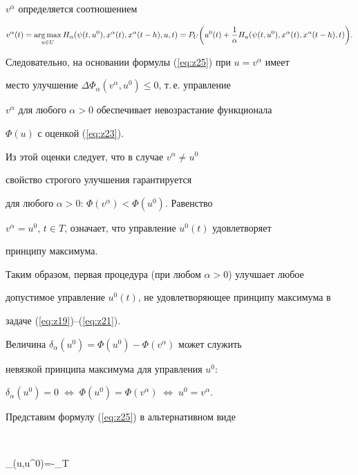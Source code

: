 $v^\alpha$ определяется соотношением


$$


v^\alpha(t)=\argmax_{u\in U}


H_\alpha(\psi(t,u^0),x^\alpha(t),x^\alpha(t-h),u,t)=


P_U\bigg(u^0(t)+\frac{1}{\alpha}


H_u(\psi(t,u^0),x^\alpha(t),x^\alpha(t-h),t)\bigg).


$$





Следовательно, на основании формулы (\ref{eq:z25}) при $u{=}v^\alpha$ имеет


место улучшение $\Delta\Phi_\alpha(v^\alpha,u^0){\leq}0$, т.\,е. управление


$v^\alpha$ для любого $\alpha>0$ обеспечивает невозрастание функционала


$\Phi(u)$ с оценкой (\ref{eq:z23}).


Из этой оценки следует, что в случае $v^\alpha\ne u^0$


свойство строгого улучшения гарантируется


для любого $\alpha>0$: $\Phi(v^\alpha)<\Phi(u^0)$. Равенство


$v^\alpha=u^0$, $t\in T$, означает, что управление $u^0(t)$ удовлетворяет


принципу максимума.





Таким образом, первая процедура (при любом $\alpha>0$) улучшает любое


допустимое управление $u^0(t)$, не удовлетворяющее принципу максимума в


задаче (\ref{eq:z19})--(\ref{eq:z21}).





Величина $\delta_\alpha(u^0)=\Phi(u^0)-\Phi(v^\alpha)$ может служить


невязкой принципа максимума для управления $u^0$:


$\delta_\alpha(u^0)=0\;\Leftrightarrow\;\Phi(u^0)=


\Phi(v^\alpha)\;\Leftrightarrow\;u^0=v^\alpha$.





Представим формулу (\ref{eq:z25}) в альтернативном виде


$$


\Delta\Phi_\alpha(u,u^0)=-\int_T


